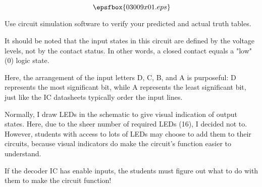 

$$\epsfbox{03009x01.eps}$$

\vfil \eject






Use circuit simulation software to verify your predicted and actual truth tables.







It should be noted that the input states in this circuit are defined by the voltage levels, not by the contact status.  In other words, a closed contact equals a "low" (0) logic state.

Here, the arrangement of the input letters D, C, B, and A is purposeful: D represents the most significant bit, while A represents the least significant bit, just like the IC datasheets typically order the input lines.

Normally, I draw LEDs in the schematic to give visual indication of output states.  Here, due to the sheer number of required LEDs (16), I decided not to.  However, students with access to lots of LEDs may choose to add them to their circuits, because visual indicators do make the circuit's function easier to understand.

If the decoder IC has enable inputs, the students must figure out what to do with them to make the circuit function!




